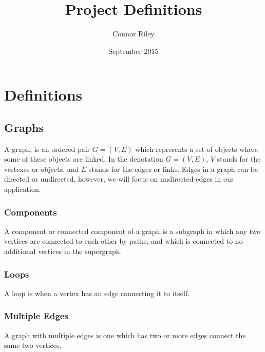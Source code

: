 \documentclass{article}
\title{Project Definitions}
\author{Connor Riley }
\date{September 2015}
\begin{document}
\maketitle


\section{Definitions}
\subsection{Graphs}
A graph, is an ordered pair $G=(V,E)$ which represents a set of objects where some of these objects are linked. In the denotation $G=(V,E)$, $V$ stands for the vertexes or objects, and $E$ stands for the edges or links. Edges in a graph can be directed or undirected, however, we will focus on undirected edges in our application.

\subsubsection{Components}
A component or connected component of a graph is a subgraph in which any two vertices are connected to each other by paths, and which is connected to no additional vertices in the supergraph.
\subsubsection{Loops}
A loop is when a vertex has an edge connecting it to itself. \citep{NIST:self-loop}
\begin{center}
\end{center}
\subsubsection{Multiple Edges}
A graph with multiple edges is one which has two or more edges connect the same two vertices.
\begin{center}
\end{center}
\end{document}
